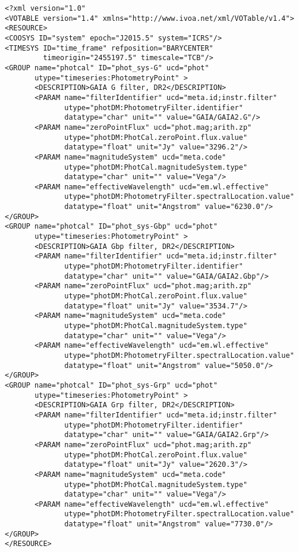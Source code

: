 \noindent
\begingroup\footnotesize
\begin{tcolorbox}
\begin{verbatim}
<?xml version="1.0" 
<VOTABLE version="1.4" xmlns="http://www.ivoa.net/xml/VOTable/v1.4">
<RESOURCE>
<COOSYS ID="system" epoch="J2015.5" system="ICRS"/>
<TIMESYS ID="time_frame" refposition="BARYCENTER" 
         timeorigin="2455197.5" timescale="TCB"/>
<GROUP name="photcal" ID="phot_sys-G" ucd="phot" 
       utype="timeseries:PhotometryPoint" > 
       <DESCRIPTION>GAIA G filter, DR2</DESCRIPTION>
       <PARAM name="filterIdentifier" ucd="meta.id;instr.filter" 
              utype="photDM:PhotometryFilter.identifier" 
              datatype="char" unit="" value="GAIA/GAIA2.G"/>
       <PARAM name="zeroPointFlux" ucd="phot.mag;arith.zp" 
              utype="photDM:PhotCal.zeroPoint.flux.value" 
              datatype="float" unit="Jy" value="3296.2"/>
       <PARAM name="magnitudeSystem" ucd="meta.code" 
              utype="photDM:PhotCal.magnitudeSystem.type" 
              datatype="char" unit="" value="Vega"/>
       <PARAM name="effectiveWavelength" ucd="em.wl.effective" 
              utype="photDM:PhotometryFilter.spectralLocation.value" 
              datatype="float" unit="Angstrom" value="6230.0"/>
</GROUP>
<GROUP name="photcal" ID="phot_sys-Gbp" ucd="phot" 
       utype="timeseries:PhotometryPoint" > 
       <DESCRIPTION>GAIA Gbp filter, DR2</DESCRIPTION>
       <PARAM name="filterIdentifier" ucd="meta.id;instr.filter" 
              utype="photDM:PhotometryFilter.identifier" 
              datatype="char" unit="" value="GAIA/GAIA2.Gbp"/>
       <PARAM name="zeroPointFlux" ucd="phot.mag;arith.zp" 
              utype="photDM:PhotCal.zeroPoint.flux.value" 
              datatype="float" unit="Jy" value="3534.7"/>
       <PARAM name="magnitudeSystem" ucd="meta.code" 
              utype="photDM:PhotCal.magnitudeSystem.type" 
              datatype="char" unit="" value="Vega"/>
       <PARAM name="effectiveWavelength" ucd="em.wl.effective" 
              utype="photDM:PhotometryFilter.spectralLocation.value" 
              datatype="float" unit="Angstrom" value="5050.0"/>
</GROUP>
<GROUP name="photcal" ID="phot_sys-Grp" ucd="phot" 
       utype="timeseries:PhotometryPoint" > 
       <DESCRIPTION>GAIA Grp filter, DR2</DESCRIPTION>
       <PARAM name="filterIdentifier" ucd="meta.id;instr.filter" 
              utype="photDM:PhotometryFilter.identifier" 
              datatype="char" unit="" value="GAIA/GAIA2.Grp"/>
       <PARAM name="zeroPointFlux" ucd="phot.mag;arith.zp" 
              utype="photDM:PhotCal.zeroPoint.flux.value" 
              datatype="float" unit="Jy" value="2620.3"/>
       <PARAM name="magnitudeSystem" ucd="meta.code" 
              utype="photDM:PhotCal.magnitudeSystem.type" 
              datatype="char" unit="" value="Vega"/>
       <PARAM name="effectiveWavelength" ucd="em.wl.effective" 
              utype="photDM:PhotometryFilter.spectralLocation.value" 
              datatype="float" unit="Angstrom" value="7730.0"/>
</GROUP>
</RESOURCE>

\end{verbatim}
\end{tcolorbox}
\endgroup


